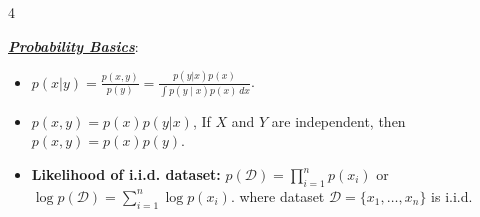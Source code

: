 \documentclass[10pt]{article}
\newcommand{\bulletPoint}[1]{\ul{\textit{\textbf{#1}}}}
\begin{document}
\singlespacing
\begin{multicols*}{4}
\scriptsize
\raggedright




\bulletPoint{Probability Basics}:

\begin{itemize}[label=$\cdot$,leftmargin=0pt]
\item $p(x | y) = \frac{p(x,y)}{p(y)} = \frac{p(y | x) p(x)}{\int p(y \mid x)p(x)\,dx}$.
\item$p(x,y) = p(x)p(y | x)$, 
If \(X\) and \(Y\) are independent, then \( p(x,y) = p(x)p(y) \).

\item\textbf{Likelihood of i.i.d. dataset:} 
$p(\mathcal{D}) = \prod_{i=1}^{n} p(x_i)$ or $\log p(\mathcal{D}) = \sum_{i=1}^{n} \log p(x_i)$. 
where dataset \( \mathcal{D} = \{x_1, \dots, x_n\} \) is i.i.d.


\end{itemize}
\end{multicols*}
\end{document}
